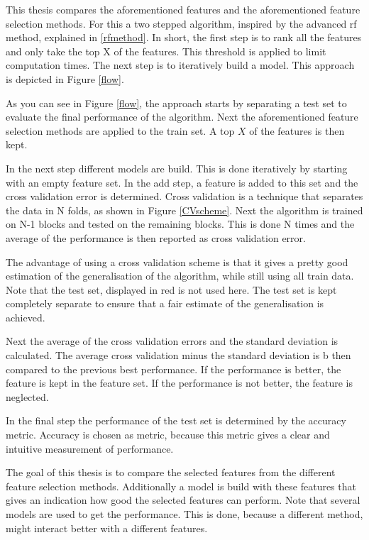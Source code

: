 This thesis compares the aforementioned features and the aforementioned feature selection methods. For this a two stepped algorithm, inspired by the advanced rf method, explained in \ref{rfmethod}. In short, the first step is to rank all the features and only take the top X of the features. This threshold is applied to limit computation times. The next step is to iteratively build a model. This approach is depicted in Figure \ref{flow}.


As you can see in Figure \ref{flow}, the approach starts by separating a test set to evaluate the final performance of the algorithm. Next the aforementioned feature selection methods are applied to the train set. A top $X$ of the features is then kept.

\npar

In the next step different models are build. This is done iteratively by starting with an empty feature set. In the add step, a feature is added to this set and the cross validation error is determined. Cross validation is a technique that separates the data in N folds, as shown in Figure \ref{CVscheme}. Next the algorithm is trained on N-1 blocks and tested on the remaining blocks. This is done N times and the average of the performance is then reported as cross validation error. 


The advantage of using a cross validation scheme is that it gives a pretty good estimation of the generalisation of the algorithm, while still using all train data. Note that the test set, displayed in red is not used here. The test set is kept completely separate to ensure that a fair estimate of the generalisation is achieved.

\npar

Next the average of the cross validation errors and the standard deviation is calculated. The average cross validation minus the standard deviation is b
then compared to the previous best performance. If the performance is better, the feature is kept in the feature set. If the performance is not better, the feature is neglected. 

\npar

In the final step the performance of the test set is determined by the accuracy metric. Accuracy is chosen as metric, because this metric gives a clear and intuitive measurement of performance.

\npar

The goal of this thesis is to compare the selected features from the different feature selection methods. Additionally a model is build with these features that gives an indication how good the selected features can perform. Note that several models are used to get the performance. This is done, because a different method, might interact better with a different features.

